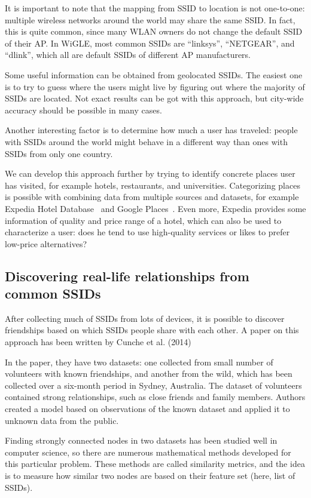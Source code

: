 \documentclass[12pt,a4paper,oneside,pdftex]{report}
\begin{document}
It is important to note that the mapping from SSID to location is not one-to-one: multiple wireless networks around the world may share the same SSID. In fact, this is quite common, since many WLAN owners do not change the default SSID of their AP. In WiGLE, most common SSIDs are ``linksys'', ``NETGEAR'', and ``dlink'', which all are default SSIDs of different AP manufacturers.

Some useful information can be obtained from geolocated SSIDs. The easiest one is to try to guess where the users might live by figuring out where the majority of SSIDs are located. Not exact results can be got with this approach, but city-wide accuracy should be possible in many cases.

Another interesting factor is to determine how much a user has traveled: people with SSIDs around the world might behave in a different way than ones with SSIDs from only one country. 

We can develop this approach further by trying to identify concrete places user has visited, for example hotels, restaurants, and universities. Categorizing places is possible with combining data from multiple sources and datasets, for example Expedia Hotel Database~\cite{expedia_hotel_db} and Google Places~\cite{google_places}. Even more, Expedia provides some information of quality and price range of a hotel, which can also be used to characterize a user: does he tend to use high-quality services or likes to prefer low-price alternatives?

\subsection{Discovering real-life relationships from common SSIDs}
\label{subsec:ssid_commons}

After collecting much of SSIDs from lots of devices, it is possible to discover friendships based on which SSIDs people share with each other. A paper on this approach has been written by Cunche et al. (2014)~\cite{cunche2014linking}

In the paper, they have two datasets: one collected from small number of volunteers with known friendships, and another from the wild, which has been collected over a six-month period in Sydney, Australia. The dataset of volunteers contained strong relationships, such as close friends and family members. Authors created a model based on observations of the known dataset and applied it to unknown data from the public.

Finding strongly connected nodes in two datasets has been studied well in computer science, so there are numerous mathematical methods developed for this particular problem. These methods are called similarity metrics, and the idea is to measure how similar two nodes are based on their feature set (here, list of SSIDs). 
\end{document}
